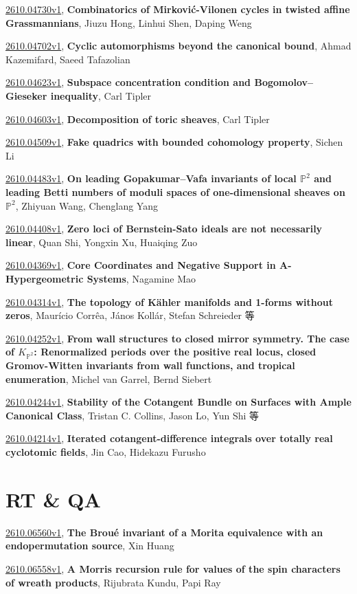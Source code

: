 \documentclass[9pt, a4paper]{article}
\theoremstyle{plain}
\theoremstyle{definition}
\theoremstyle{remark}
\newcommand{\arxiv}[3]{\href{https://arxiv.org/abs/#1}{#1}, \textbf{\textcolor{arxivblue}{#2}}, #3}
\begin{document}
\arxiv{2610.04730v1}{Combinatorics of Mirković-Vilonen cycles in twisted affine Grassmannians}{Jiuzu Hong, Linhui Shen, Daping Weng}

\arxiv{2610.04702v1}{Cyclic automorphisms beyond the canonical bound}{Ahmad Kazemifard, Saeed Tafazolian}

\arxiv{2610.04623v1}{Subspace concentration condition and Bogomolov--Gieseker inequality}{Carl Tipler}

\arxiv{2610.04603v1}{Decomposition of toric sheaves}{Carl Tipler}

\arxiv{2610.04509v1}{Fake quadrics with bounded cohomology property}{Sichen Li}

\arxiv{2610.04483v1}{On leading Gopakumar--Vafa invariants of local $\mathbb{P}^2$ and leading Betti numbers of moduli spaces of one-dimensional sheaves on $\mathbb{P}^2$}{Zhiyuan Wang, Chenglang Yang}

\arxiv{2610.04408v1}{Zero loci of Bernstein-Sato ideals are not necessarily linear}{Quan Shi, Yongxin Xu, Huaiqing Zuo}

\arxiv{2610.04369v1}{Core Coordinates and Negative Support in A-Hypergeometric Systems}{Nagamine Mao}

\arxiv{2610.04314v1}{The topology of Kähler manifolds and 1-forms without zeros}{Maurício Corrêa, János Kollár, Stefan Schreieder 等}

\arxiv{2610.04252v1}{From wall structures to closed mirror symmetry. The case of $K_{\mathbb{P}^2}$: Renormalized periods over the positive real locus, closed Gromov-Witten invariants from wall functions, and tropical enumeration}{Michel van Garrel, Bernd Siebert}

\arxiv{2610.04244v1}{Stability of the Cotangent Bundle on Surfaces with Ample Canonical Class}{Tristan C. Collins, Jason Lo, Yun Shi 等}

\arxiv{2610.04214v1}{Iterated cotangent-difference integrals over totally real cyclotomic fields}{Jin Cao, Hidekazu Furusho}


\section{RT \& QA}
\arxiv{2610.06560v1}{The Broué invariant of a Morita equivalence with an endopermutation source}{Xin Huang}

\arxiv{2610.06558v1}{A Morris recursion rule for values of the spin characters of wreath products}{Rijubrata Kundu, Papi Ray}
\end{document}
